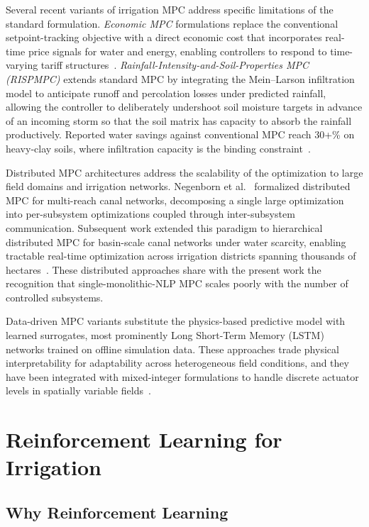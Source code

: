 Several recent variants of irrigation MPC address specific limitations
of the standard formulation. \emph{Economic MPC} formulations replace
the conventional setpoint-tracking objective with a direct economic
cost that incorporates real-time price signals for water and energy,
enabling controllers to respond to time-varying tariff
structures~\cite{Sharma2025}. \emph{Rainfall-Intensity-and-Soil-Properties
MPC (RISPMPC)} extends standard MPC by integrating the Mein--Larson
infiltration model to anticipate runoff and percolation losses under
predicted rainfall, allowing the controller to deliberately undershoot
soil moisture targets in advance of an incoming storm so that the
soil matrix has capacity to absorb the rainfall productively. Reported
water savings against conventional MPC reach 30+\% on heavy-clay
soils, where infiltration capacity is the binding constraint~\cite{Sharma2025}.

Distributed MPC architectures address the scalability of the
optimization to large field domains and irrigation networks. Negenborn
et al.~\cite{negenborn2009distmpc} formalized distributed MPC for
multi-reach canal networks, decomposing a single large optimization
into per-subsystem optimizations coupled through inter-subsystem
communication. Subsequent work extended this paradigm to hierarchical
distributed MPC for basin-scale canal networks under water scarcity,
enabling tractable real-time optimization across irrigation districts
spanning thousands of hectares~\cite{LopezJimenez2022}. These
distributed approaches share with the present work the recognition
that single-monolithic-NLP MPC scales poorly with the number of
controlled subsystems.

Data-driven MPC variants substitute the physics-based predictive model
with learned surrogates, most prominently Long Short-Term Memory
(LSTM) networks trained on offline simulation data. These approaches
trade physical interpretability for adaptability across heterogeneous
field conditions, and they have been integrated with mixed-integer
formulations to handle discrete actuator levels in spatially variable
fields~\cite{Maniam2026}.

\section{Reinforcement Learning for Irrigation}
\label{sec:lit-rl}

\subsection{Why Reinforcement Learning}


